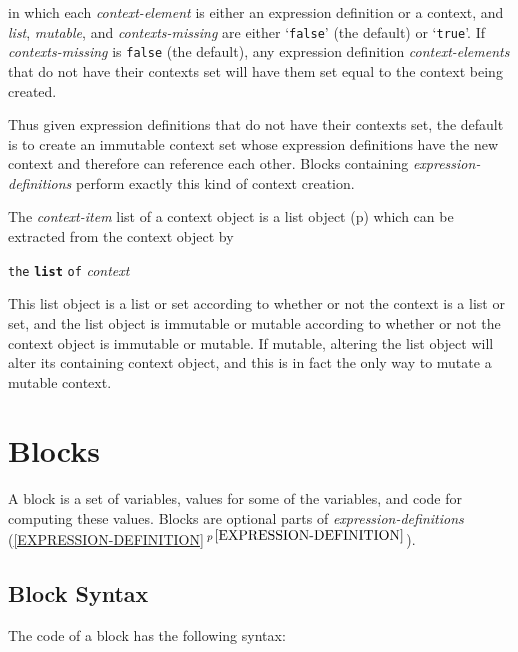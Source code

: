 \documentclass[12pt]{article}
\makeatletter
\newcommand{\ttmkey}[2]{{\tt \bf #1}\index{#1@{\tt #1}!#2}}
\newcommand{\secref}[1]{\ref{#1}$\,^{p\,\pageref{#1}}$}
\newcommand{\pagref}[1]{p\pageref{#1}}
\newenvironment{indpar}[1][0.3in]%
	{\begin{list}{}%
		     {\setlength{\itemsep}{0in}%
		      \setlength{\topsep}{0in}%
		      \setlength{\parsep}{1ex}%
		      \setlength{\labelwidth}{#1}%
		      \setlength{\leftmargin}{#1}%
		      \addtolength{\leftmargin}{\labelsep}}%
	 \item}%
	{\end{list}}
\makeatother
\begin{document}
in which each {\em context-element} is either an expression definition or
a context, and {\em list}, {\em mutable}, and {\em contexts-missing}
are either `{\tt false}' (the default) or `{\tt true}'.
If {\em contexts-missing} is {\tt false} (the default), any expression
definition {\em context-elements} that do not have their
contexts set will have them set equal to the context being created.

Thus given expression definitions that do not have their contexts set,
the default is to create an immutable context set whose expression definitions
have the new context and therefore can reference each other.  Blocks
containing {\em expression-definitions} perform exactly this kind of
context creation.

The {\em context-item} list of a context object is a list object
(\pagref{LIST}) which can be extracted from the context object by

\begin{indpar}
\verb|the| \ttmkey{list}{of context} \verb|of| {\em context}
\end{indpar}

This list object is a list or set according to whether or not the
context is a list or set, and the list object is immutable or mutable
according to whether or not the context object is immutable or mutable.
If mutable, altering the list object will alter its containing context
object, and this is in fact the only way to mutate a mutable context.

\section{Blocks}
\label{BLOCKS}

A block is a set of variables, values for some of the variables, and
code for computing these values.  Blocks are optional parts of
{\em expression-definitions} (\secref{EXPRESSION-DEFINITION}).

\subsection{Block Syntax}
\label{BLOCK-SYNTAX}

The code of a block has the following syntax:
\end{document}
